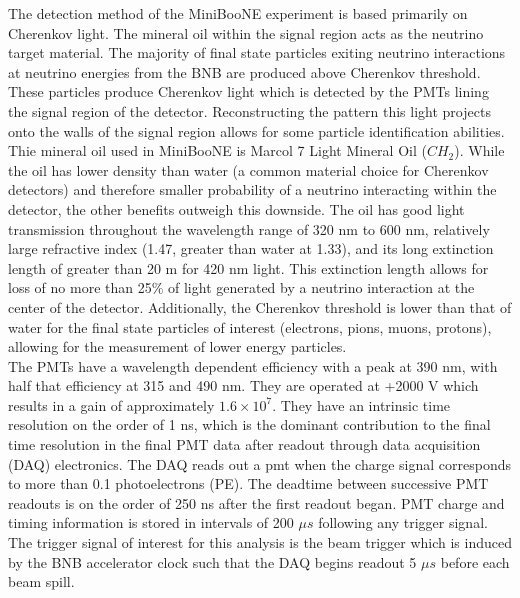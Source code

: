 The detection method of the MiniBooNE experiment is based primarily on Cherenkov light. The mineral oil within the signal region acts as the neutrino target material. The majority of final state particles exiting neutrino interactions at neutrino energies from the BNB are produced above Cherenkov threshold. These particles produce Cherenkov light which is detected by the PMTs lining the signal region of the detector. Reconstructing the pattern this light projects onto the walls of the signal region allows for some particle identification abilities.\\

Thie mineral oil used in MiniBooNE is Marcol 7 Light Mineral Oil ($CH_2$). While the oil has lower density than water (a common material choice for Cherenkov detectors) and therefore smaller probability of a neutrino interacting within the detector, the other benefits outweigh this downside. The oil has good light transmission throughout the wavelength range of 320 nm to 600 nm, relatively large refractive index (1.47, greater than water at 1.33), and its long extinction length of greater than 20 m for 420 nm light. This extinction length allows for loss of no more than 25\% of light generated by a neutrino interaction at the center of the detector. Additionally, the Cherenkov threshold is lower than that of water for the final state particles of interest (electrons, pions, muons, protons), allowing for the measurement of lower energy particles.\\

The PMTs have a wavelength dependent efficiency with a peak at 390 nm, with half that efficiency at 315 and 490 nm. They are operated at +2000 V which results in a gain of approximately $1.6 \times 10^7$. They have an intrinsic time resolution on the order of 1 ns, which is the dominant contribution to the final time resolution in the final PMT data after readout through data acquisition (DAQ) electronics. The DAQ reads out a pmt when the charge signal corresponds to more than 0.1 photoelectrons (PE). The deadtime between successive PMT readouts is on the order of 250 ns after the first readout began. PMT charge and timing information is stored in intervals of 200 $\mu s$ following any trigger signal. The trigger signal of interest for this analysis is the beam trigger which is induced by the BNB accelerator clock such that the DAQ begins readout 5 $\mu s$ before each beam spill.\\

